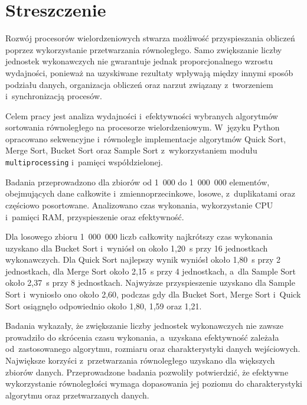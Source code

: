 \cleardoublepage
\chapter*{Streszczenie}

Rozwój procesorów wielordzeniowych stwarza możliwość przyspieszania obliczeń poprzez wykorzystanie przetwarzania równoległego. 
Samo zwiększanie liczby jednostek wykonawczych nie gwarantuje jednak proporcjonalnego wzrostu wydajności, 
ponieważ na uzyskiwane rezultaty wpływają między innymi sposób podziału danych, 
organizacja obliczeń oraz narzut związany z~tworzeniem i~synchronizacją procesów. 

Celem pracy jest analiza wydajności i~efektywności wybranych algorytmów sortowania równoległego na procesorze wielordzeniowym. 
W~języku Python opracowano sekwencyjne i~równoległe implementacje algorytmów Quick Sort,
Merge Sort, Bucket Sort oraz Sample Sort z~wykorzystaniem modułu \texttt{multiprocessing} i~pamięci współdzielonej.

Badania przeprowadzono dla zbiorów od 1~000 do 1~000~000 elementów, obejmujących dane całkowite i~zmiennoprzecinkowe, 
losowe, z~duplikatami oraz częściowo posortowane.
Analizowano czas wykonania, wykorzystanie CPU i~pamięci RAM, przyspieszenie oraz efektywność. 

Dla losowego zbioru 1~000~000 liczb całkowity najkrótszy czas wykonania uzyskano dla 
Bucket Sort i~wyniósł on około 1,20~s przy 16 jednostkach wykonawczych. 
Dla Quick Sort najlepszy wynik wyniósł około 1,80~s przy 2 jednostkach, 
dla Merge Sort około 2,15~s przy 4 jednostkach, a~dla Sample Sort około 2,37~s przy 8 jednostkach. 
Najwyższe przyspieszenie uzyskano dla Sample Sort i~wyniosło ono około 2,60, 
podczas gdy dla Bucket Sort, Merge Sort i~Quick Sort osiągnęło odpowiednio około 1,80, 1,59 oraz 1,21.

Badania wykazały, że zwiększanie liczby jednostek wykonawczych nie zawsze prowadziło do skrócenia czasu wykonania, 
a~uzyskana efektywność zależała od~zastosowanego algorytmu, rozmiaru oraz charakterystyki danych wejściowych.
Największe korzyści z~przetwarzania równoległego uzyskano dla większych zbiorów danych. 
Przeprowadzone badania pozwoliły potwierdzić, że efektywne wykorzystanie 
równoległości wymaga dopasowania jej poziomu do charakterystyki algorytmu oraz przetwarzanych danych.